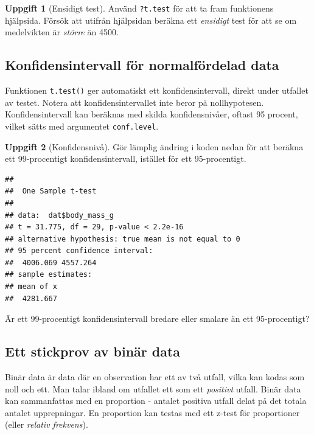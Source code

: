 \documentclass[
]{book}
\newenvironment{Shaded}{\begin{snugshade}}{\end{snugshade}}
\newcommand{\AttributeTok}[1]{\textcolor[rgb]{0.13,0.29,0.53}{#1}}
\newcommand{\FloatTok}[1]{\textcolor[rgb]{0.00,0.00,0.81}{#1}}
\newcommand{\FunctionTok}[1]{\textcolor[rgb]{0.13,0.29,0.53}{\textbf{#1}}}
\newcommand{\NormalTok}[1]{#1}
\newcommand{\SpecialCharTok}[1]{\textcolor[rgb]{0.81,0.36,0.00}{\textbf{#1}}}
\theoremstyle{definition}
\theoremstyle{definition}
\theoremstyle{definition}
\newtheorem{exercise}{Uppgift}[chapter]
\theoremstyle{definition}
\theoremstyle{remark}
\begin{document}
\begin{exercise}[Ensidigt test]
Använd \texttt{?t.test} för att ta fram funktionens hjälpsida. Försök att utifrån hjälpsidan beräkna ett \emph{ensidigt} test för att se om medelvikten är \emph{större} än 4500.
\end{exercise}

\subsection{Konfidensintervall för normalfördelad data}\label{konfidensintervall-fuxf6r-normalfuxf6rdelad-data}

Funktionen \texttt{t.test()} ger automatiskt ett konfidensintervall, direkt under utfallet av testet. Notera att konfidensintervallet inte beror på nollhypotesen. Konfidensintervall kan beräknas med skilda konfidensnivåer, oftast 95 procent, vilket sätts med argumentet \texttt{conf.level}.

\begin{exercise}[Konfidensnivå]
Gör lämplig ändring i koden nedan för att beräkna ett 99-procentigt konfidensintervall, istället för ett 95-procentigt.

\begin{Shaded}
\end{Shaded}

\begin{verbatim}
## 
##  One Sample t-test
## 
## data:  dat$body_mass_g
## t = 31.775, df = 29, p-value < 2.2e-16
## alternative hypothesis: true mean is not equal to 0
## 95 percent confidence interval:
##  4006.069 4557.264
## sample estimates:
## mean of x 
##  4281.667
\end{verbatim}

Är ett 99-procentigt konfidensintervall bredare eller smalare än ett 95-procentigt?
\end{exercise}

\subsection{Ett stickprov av binär data}\label{ett-stickprov-av-binuxe4r-data}

Binär data är data där en observation har ett av två utfall, vilka kan kodas som noll och ett. Man talar ibland om utfallet ett som ett \emph{positivt} utfall. Binär data kan sammanfattas med en proportion - antalet positiva utfall delat på det totala antalet upprepningar. En proportion kan testas med ett z-test för proportioner (eller \emph{relativ frekvens}).
\end{document}
